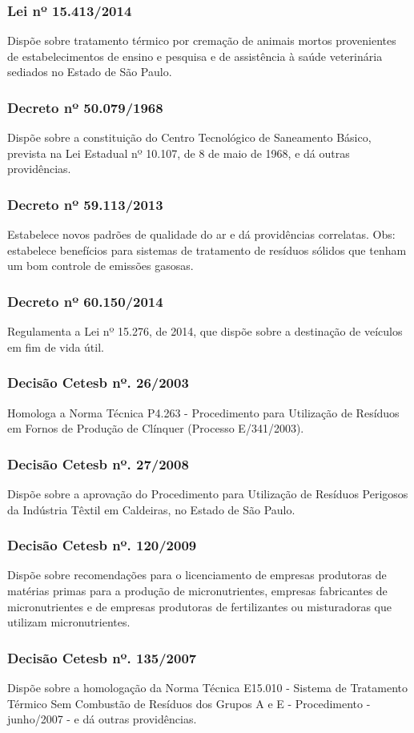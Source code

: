 \begin{subapend}
\begin{subsubapend}
		\subsubsection{Lei nº 15.413/2014}
		Dispõe sobre tratamento térmico por cremação de animais mortos provenientes de estabelecimentos de ensino e pesquisa e de assistência à saúde veterinária sediados no Estado de São Paulo.
		\subsubsection{Decreto nº 50.079/1968}
		Dispõe sobre a constituição do Centro Tecnológico de Saneamento Básico, prevista na Lei Estadual nº 10.107, de 8 de maio de 1968, e dá outras providências.
		\subsubsection{Decreto nº 59.113/2013}
		Estabelece novos padrões de qualidade do ar e dá providências correlatas. Obs: estabelece benefícios para sistemas de tratamento de resíduos sólidos que tenham um bom controle de emissões gasosas.
		\subsubsection{Decreto nº 60.150/2014}
		Regulamenta a Lei nº 15.276, de 2014, que dispõe sobre a destinação de veículos em fim de vida útil.
		\subsubsection{Decisão Cetesb nº. 26/2003}
		Homologa a Norma Técnica P4.263 - Procedimento para Utilização de Resíduos em Fornos de Produção de Clínquer (Processo E/341/2003).
		\subsubsection{Decisão Cetesb nº. 27/2008}
		Dispõe sobre a aprovação do Procedimento para Utilização de Resíduos Perigosos da Indústria Têxtil em Caldeiras, no Estado de São Paulo.
		\subsubsection{Decisão Cetesb nº. 120/2009}
		Dispõe sobre recomendações para o licenciamento de empresas produtoras de matérias primas para a produção de micronutrientes, empresas fabricantes de micronutrientes e de empresas produtoras de fertilizantes ou misturadoras que utilizam micronutrientes.
		\subsubsection{Decisão Cetesb nº. 135/2007}
		Dispõe sobre a homologação da Norma Técnica E15.010 - Sistema de Tratamento Térmico Sem Combustão de Resíduos dos Grupos A e E - Procedimento - junho/2007 - e dá outras providências.

\end{subsubapend}
\end{subapend}
